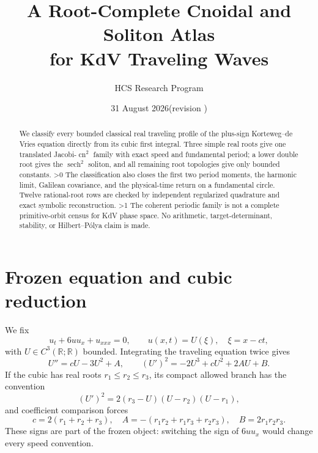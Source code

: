 \documentclass[10pt]{article}
\title{A Root-Complete Cnoidal and Soliton Atlas\\for KdV Traveling Waves}
\author{HCS Research Program}
\date{31 August 2026\quad (revision \CRevisionRound)}
\newcommand{\R}{\mathbb R}
\newcommand{\cn}{\operatorname{cn}}
\newcommand{\sech}{\operatorname{sech}}
\begin{document}
\maketitle
\begin{abstract}
We classify every bounded classical real traveling profile of the plus-sign
Korteweg--de Vries equation directly from its cubic first integral.  Three
simple real roots give one translated Jacobi-$\cn^2$ family with exact speed
and fundamental period; a lower double root gives the $\sech^2$ soliton, and
all remaining root topologies give only bounded constants.
\ifnum\CRevisionRound>0
The classification also closes the first two period moments, the harmonic
limit, Galilean covariance, and the physical-time return on a fundamental
circle.  Twelve rational-root rows are checked by independent regularized
quadrature and exact symbolic reconstruction.
\fi
\ifnum\CRevisionRound>1
The coherent periodic family is not a complete primitive-orbit census for
KdV phase space.  No arithmetic, target-determinant, stability, or
Hilbert--Pólya claim is made.
\fi
\end{abstract}

\section{Frozen equation and cubic reduction}
We fix
\begin{equation}
 u_t+6uu_x+u_{xxx}=0,\qquad u(x,t)=U(\xi),\quad \xi=x-ct,
 \label{eq:kdv}
\end{equation}
with $U\in C^3(\R;\R)$ bounded.  Integrating the traveling equation twice
gives
\begin{equation}
 U''=cU-3U^2+A,\qquad
 (U')^2=-2U^3+cU^2+2AU+B.                 \label{eq:first}
\end{equation}
If the cubic has real roots $r_1\le r_2\le r_3$, its compact allowed branch
has the convention
\begin{equation}
 (U')^2=2(r_3-U)(U-r_2)(U-r_1),           \label{eq:factor}
\end{equation}
and coefficient comparison forces
\begin{equation}
 c=2(r_1+r_2+r_3),\quad
 A=-(r_1r_2+r_1r_3+r_2r_3),\quad B=2r_1r_2r_3. \label{eq:coeff}
\end{equation}
These signs are part of the frozen object: switching the sign of $6uu_x$
would change every speed convention.
\end{document}
